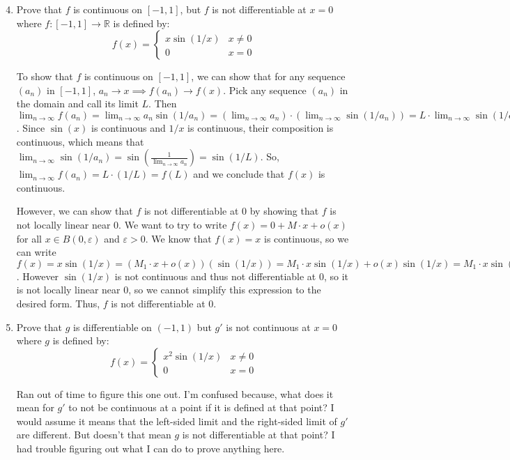 \documentclass[11pt]{article}
\newcommand{\R}{\mathbb{R}}
\begin{document}
\begin{enumerate}
\setcounter{enumi}{3}

\item{Prove that $f$ is continuous on $[-1,1]$, but $f$ is not differentiable
at $x=0$ where $f:[-1,1]\to\R$ is defined by:}
\[f(x)=\begin{cases}
        x\sin(1/x)  & x\neq0\\
        0           & x=0
\end{cases}
\]

To show that $f$ is continuous on $[-1,1]$, we can show that for any sequence
$(a_n)$ in $[-1,1]$, $a_n\to x\implies f(a_n)\to f(x)$.
Pick any sequence $(a_n)$ in the domain and call its limit $L$. Then
$\lim_{n\to\infty}f(a_n)=\lim_{n\to\infty}a_n\sin(1/a_n)=
(\lim_{n\to\infty}a_n)\cdot(\lim_{n\to\infty}\sin(1/a_n))=
L\cdot\lim_{n\to\infty}\sin(1/a_n)$. Since $\sin(x)$ is continuous and
$1/x$ is continuous, their composition is continuous, which means that
$\lim_{n\to\infty}\sin(1/a_n)=\sin\left(\frac{1}{\lim_{n\to\infty}a_n}\right)=
\sin(1/L)$. So, $\lim_{n\to\infty}f(a_n)=L\cdot(1/L)=f(L)$ and we conclude
that $f(x)$ is continuous.

However, we can show that $f$ is not differentiable at 0 by showing that
$f$ is not locally linear near 0. We want to try to write
$f(x)=0+M\cdot x+o(x)$ for all $x\in B(0,\varepsilon)$ and $\varepsilon>0$.
We know that $f(x)=x$ is continuous, so we can write
$f(x)=x\sin(1/x)=(M_1\cdot x+o(x))(\sin(1/x))=M_1\cdot x\sin(1/x)+o(x)\sin(1/x)
=M_1\cdot x\sin(1/x)+o(x)$. However $\sin(1/x)$ is not continuous and thus
not differentiable at 0, so it is not locally linear near 0, so
we cannot simplify this expression to the desired form. Thus,
$f$ is not differentiable at 0.


\item{Prove that $g$ is differentiable on $(-1,1)$ but $g'$ is not
continuous at $x=0$ where $g$ is defined by:}
\[f(x)=\begin{cases}
        x^2\sin(1/x)    & x\neq0\\
        0               & x=0
\end{cases}
\]

Ran out of time to figure this one out. 
I'm confused because, what does it mean for $g'$ to not be continuous at a 
point if it is defined at that point? I would assume it means that
the left-sided limit and the right-sided limit of $g'$ are different.
But doesn't that mean $g$ is not differentiable at that point? I
had trouble figuring out what I can do to prove anything here.


\end{enumerate}
\end{document}
